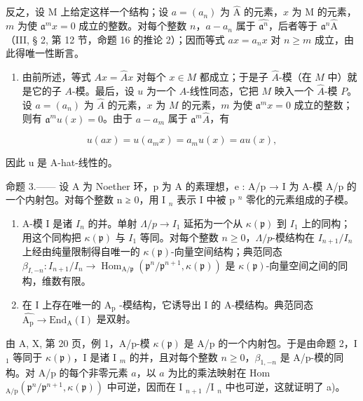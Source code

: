 反之，设 M 上给定这样一个结构；设 \(a = (a_{n})\) 为 \(\widehat{\mathrm{A}}\) 的元素，\(x\) 为 M 的元素，\(m\) 为使 \(\mathfrak{a}^{m}x = 0\) 成立的整数。对每个整数 \(n\)，\(a - a_{n}\) 属于 \(\widehat{\mathfrak{a}^{n}}\)，后者等于 \(\mathfrak{a}^{n}\widehat{\mathrm{A}}\)（III, § 2, 第 12 节，命题 16 的推论 2）；因而等式 \(ax = a_{n}x\) 对 \(n \geqslant m\) 成立，由此得唯一性断言。

\begin{enumerate}
\def\labelenumi{\alph{enumi})}
\setcounter{enumi}{1}
\tightlist
\item
  由前所述，等式 \(Ax = \widehat{A}x\) 对每个 \(x \in M\) 都成立；于是子 \(\widehat{A}\)-模（在 \(M\) 中）就是它的子 \(A\)-模。最后，设 \(u\) 为一个 \(A\)-线性同态，它把 \(M\) 映入一个 \(\widehat{A}\)-模 \(P\)。设 \(a = (a_n)\) 为 \(\widehat{A}\) 的元素，\(x\) 为 \(M\) 的元素，\(m\) 为使 \(\mathfrak{a}^m x = 0\) 成立的整数；则有 \(\mathfrak{a}^m u(x) = 0\)。由于 \(a - a_m\) 属于 \(\mathfrak{a}^m\widehat{A}\)，有
\end{enumerate}

\[
u (a x) = u \left(a _ {m} x\right) = a _ {m} u (x) = a u (x),
\]

因此 u 是 A-hat-线性的。

命题 3.—— 设 A 为 Noether 环，p 为 A 的素理想，e : A/p → I 为 A-模 A/p 的一个内射包。对每个整数 n ≥ 0，用 I \(_{n}\) 表示 I 中被 p \(^{n}\) 零化的元素组成的子模。

\begin{enumerate}
\def\labelenumi{\alph{enumi})}
\item
  A-模 I 是诸 \(I_{n}\) 的并。单射 \(\Lambda/p \to I_{1}\) 延拓为一个从 \(\kappa(\mathfrak{p})\) 到 \(I_{1}\) 上的同构；用这个同构把 \(\kappa(\mathfrak{p})\) 与 \(I_{1}\) 等同。对每个整数 \(n \geqslant 0\)，\(\Lambda/p\)-模结构在 \(I_{n+1}/I_{n}\) 上经由纯量限制得自唯一的 \(\kappa(\mathfrak{p})\)-向量空间结构；典范同态 \(\beta_{I,-n}: I_{n+1}/I_{n} \longrightarrow \operatorname{Hom}_{\mathrm{A}/\mathfrak{p}}(\mathfrak{p}^{n}/\mathfrak{p}^{n+1}, \kappa(\mathfrak{p}))\) 是 \(\kappa(\mathfrak{p})\)-向量空间之间的同构，维数有限。
\item
  在 I 上存在唯一的 \(\mathrm{A_p}\) -模结构，它诱导出 I 的 A-模结构。典范同态 \(\widehat{\mathrm{A_p}} \longrightarrow \mathrm{End}_{\mathrm{A}}(\mathrm{I})\) 是双射。
\end{enumerate}

由 A, X, 第 20 页，例 1，A/p-模 \(\kappa(\mathfrak{p})\) 是 A/p 的一个内射包。于是由命题 2，I \(_1\) 等同于 \(\kappa(\mathfrak{p})\)，I 是诸 I \(_m\) 的并，且对每个整数 \(n \geqslant 0\)，\(\beta_{1,-n}\) 是 A/p-模的同构。对 A/p 的每个非零元素 \(a\)，以 \(a\) 为比的乘法映射在 Hom \(_{\text{A/p}}(\mathfrak{p}^n/\mathfrak{p}^{n+1}, \kappa(\mathfrak{p}))\) 中可逆，因而在 I \(_{n+1}\) /I \(_n\) 中也可逆，这就证明了 a)。

